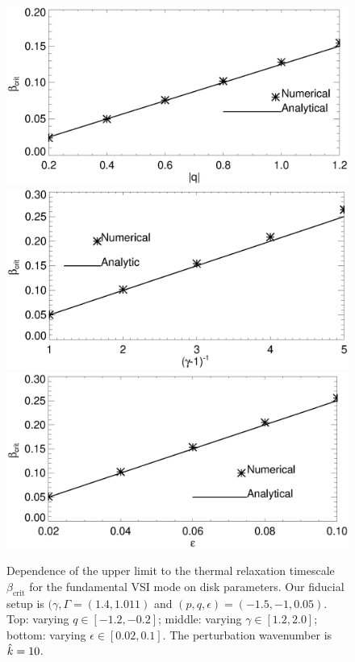 \begin{figure}
  \includegraphics[width=\linewidth,clip=true,trim=0cm 0.cm 0cm
  0cm]{figures/bcrit_compare_q.ps} 
  \includegraphics[width=\linewidth,clip=true,trim=0cm 0.0cm 0cm
  0.8cm]{figures/bcrit_compare_g.ps}
  \includegraphics[width=\linewidth,clip=true,trim=0cm 0.0cm 0cm
  0.8cm]{figures/bcrit_compare_e.ps} 
  \caption{Dependence of the upper limit to the thermal relaxation timescale
    $\beta_\mathrm{crit}$ for the fundamental VSI mode on disk
    parameters. Our fiducial setup is $(\gamma, \Gamma= (1.4, 1.011)$
    and $(p,q,\epsilon)=(-1.5,-1,0.05)$. Top: varying 
    $q\in[-1.2,-0.2]$; middle: varying $\gamma\in[1.2,2.0]$; bottom:
    varying $\epsilon\in[0.02,0.1]$. The perturbation wavenumber is
    $\hat{k}=10$.  
    \label{bcrit_compare}}  
\end{figure}

